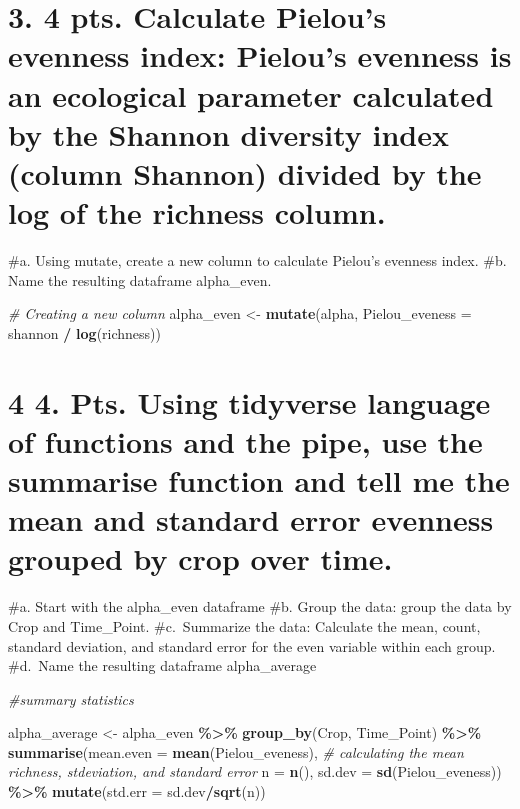 \documentclass[
]{article}
\newenvironment{Shaded}{\begin{snugshade}}{\end{snugshade}}
\newcommand{\AttributeTok}[1]{\textcolor[rgb]{0.13,0.29,0.53}{#1}}
\newcommand{\CommentTok}[1]{\textcolor[rgb]{0.56,0.35,0.01}{\textit{#1}}}
\newcommand{\FunctionTok}[1]{\textcolor[rgb]{0.13,0.29,0.53}{\textbf{#1}}}
\newcommand{\NormalTok}[1]{#1}
\newcommand{\OtherTok}[1]{\textcolor[rgb]{0.56,0.35,0.01}{#1}}
\newcommand{\SpecialCharTok}[1]{\textcolor[rgb]{0.81,0.36,0.00}{\textbf{#1}}}
\begin{document}
\section{3. 4 pts. Calculate Pielou's evenness index: Pielou's evenness
is an ecological parameter calculated by the Shannon diversity index
(column Shannon) divided by the log of the richness
column.}\label{pts.-calculate-pielous-evenness-index-pielous-evenness-is-an-ecological-parameter-calculated-by-the-shannon-diversity-index-column-shannon-divided-by-the-log-of-the-richness-column.}

\#a. Using mutate, create a new column to calculate Pielou's evenness
index. \#b. Name the resulting dataframe alpha\_even.

\begin{Shaded}
\begin{Highlighting}[]
\CommentTok{\# Creating a new column}
\NormalTok{alpha\_even  }\OtherTok{\textless{}{-}}  \FunctionTok{mutate}\NormalTok{(alpha, }\AttributeTok{Pielou\_eveness =}\NormalTok{ shannon }\SpecialCharTok{/} \FunctionTok{log}\NormalTok{(richness))}
\end{Highlighting}
\end{Shaded}

\section{4 4. Pts. Using tidyverse language of functions and the pipe,
use the summarise function and tell me the mean and standard error
evenness grouped by crop over
time.}\label{pts.-using-tidyverse-language-of-functions-and-the-pipe-use-the-summarise-function-and-tell-me-the-mean-and-standard-error-evenness-grouped-by-crop-over-time.}

\#a. Start with the alpha\_even dataframe \#b. Group the data: group the
data by Crop and Time\_Point. \#c.~Summarize the data: Calculate the
mean, count, standard deviation, and standard error for the even
variable within each group. \#d.~Name the resulting dataframe
alpha\_average

\begin{Shaded}
\begin{Highlighting}[]
\CommentTok{\#summary statistics}

\NormalTok{alpha\_average  }\OtherTok{\textless{}{-}}\NormalTok{  alpha\_even }\SpecialCharTok{\%\textgreater{}\%}
    \FunctionTok{group\_by}\NormalTok{(Crop, Time\_Point) }\SpecialCharTok{\%\textgreater{}\%}
    \FunctionTok{summarise}\NormalTok{(}\AttributeTok{mean.even =} \FunctionTok{mean}\NormalTok{(Pielou\_eveness), }\CommentTok{\# calculating the mean richness, stdeviation, and standard error}
            \AttributeTok{n =} \FunctionTok{n}\NormalTok{(), }
            \AttributeTok{sd.dev =} \FunctionTok{sd}\NormalTok{(Pielou\_eveness)) }\SpecialCharTok{\%\textgreater{}\%}
    \FunctionTok{mutate}\NormalTok{(}\AttributeTok{std.err =}\NormalTok{ sd.dev}\SpecialCharTok{/}\FunctionTok{sqrt}\NormalTok{(n))}
\end{Highlighting}
\end{Shaded}
\end{document}
